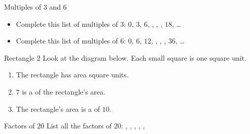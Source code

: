 \documentclass[12pt,letterpaper]{article}
\begin{document}
\begin{problem}{Multiples of $3$ and $6$}

 \begin{itemize}
  \item
 Complete this list of multiples of $3$:
 $0$, $3$, $6$, \underline{\hspace{2em}},
 \underline{\hspace{2em}}, \underline{\hspace{2em}},
 $18$, \ldots

 \item
 Complete this list of multiples of $6$:
 $0$, $6$, $12$, \underline{\hspace{2em}},
 \underline{\hspace{2em}}, \underline{\hspace{2em}},
 $36$, \ldots
 \end{itemize}
\end{problem}

\begin{problem}{Rectangle 2}
 Look at the diagram below. Each small square is one square
 unit.

 \begin{center}
 \end{center}

 \begin{enumerate}
  \item The rectangle has area \underline{\hspace{4em}}
  square units.
  \item $7$ is a \underline{\hspace{10em}} of the
  rectangle's area.
  \item The rectangle's area is a \underline{\hspace{10em}}
  of $10$.
 \end{enumerate}
\end{problem}

\begin{problem}{Factors of $20$}
 List all the factors of $20$:
 \underline{\hspace{2em}}, \underline{\hspace{2em}},
 \underline{\hspace{2em}}, \underline{\hspace{2em}},
 \underline{\hspace{2em}}, \underline{\hspace{2em}}
\end{problem}
\end{document}
